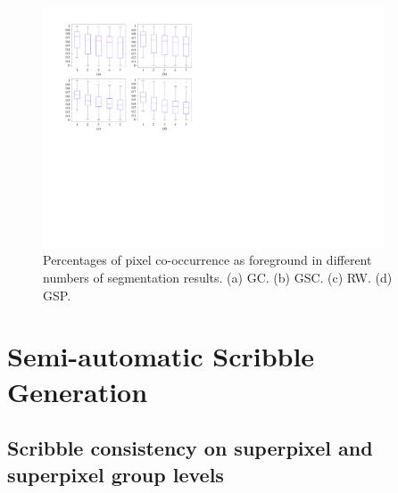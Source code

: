 \documentclass[runningheads,a4paper]{llncs}
\begin{document}
\begin{figure}[!h]
\centering
\includegraphics[width=0.9\textwidth]{fig_segment.pdf}
\caption{Percentages of pixel co-occurrence as foreground in different numbers of segmentation results. (a) GC. (b) GSC. (c) RW. (d) GSP.
}
\label{fig:segment}
\end{figure}



\section{Semi-automatic Scribble Generation}

\subsection{Scribble consistency on superpixel and superpixel group levels}
\end{document}
